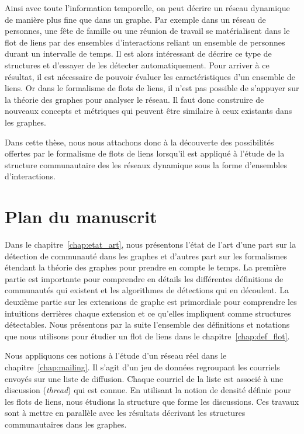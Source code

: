 Ainsi avec toute l'information temporelle, on peut décrire un réseau dynamique de manière plus fine que dans un graphe.
Par exemple dans un réseau de personnes, une fête de famille ou une réunion de travail se matérialisent dans le flot de liens par des ensembles d'interactions reliant un ensemble de personnes durant un intervalle de temps.
Il est alors intéressant de décrire ce type de structures et d'essayer de les détecter automatiquement.
Pour arriver à ce résultat, il est nécessaire de pouvoir évaluer les caractéristiques d'un ensemble de liens.
Or dans le formalisme de flots de liens, il n'est pas possible de s'appuyer sur la théorie des graphes pour analyser le réseau.
Il faut donc construire de nouveaux concepts et métriques qui peuvent être similaire à ceux existants dans les graphes.

\bigskip

Dans cette thèse, nous nous attachons donc à la découverte des possibilités offertes par le formalisme de flots de liens lorsqu'il est appliqué à l'étude de la structure communautaire des les réseaux dynamique sous la forme d'ensembles d'interactions.

\section*{Plan du manuscrit}


Dans le chapitre~\ref{chap:etat_art}, nous présentons l'état de l'art d'une part sur la détection de communauté dans les graphes et d'autres part sur les formalismes étendant la théorie des graphes pour prendre en compte le temps.
La première partie est importante pour comprendre en détails les différentes définitions de communautés qui existent et les algorithmes de détections qui en découlent.
La deuxième partie sur les extensions de graphe est primordiale pour comprendre les intuitions derrières chaque extension et ce qu'elles impliquent comme structures détectables.
Nous présentons par la suite l'ensemble des définitions et notations que nous utilisons pour étudier un flot de liens dans le chapitre~\ref{chap:def_flot}.

Nous appliquons ces notions à l'étude d'un réseau réel dans le chapitre~\ref{chap:mailing}.
Il s'agit d'un jeu de données regroupant les courriels envoyés sur une liste de diffusion.
Chaque courriel de la liste est associé à une discussion (\emph{thread}) qui est connue.
En utilisant la notion de densité définie pour les flots de liens, nous étudions la structure que forme les discussions.
Ces travaux sont à mettre en parallèle avec les résultats décrivant les structures communautaires dans les graphes.


